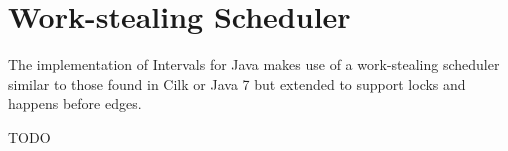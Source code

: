 
\chapter{Work-stealing Scheduler}
\label{chap:work-stealing-scheduler}

The implementation of Intervals for Java makes use of a work-stealing
scheduler similar to those found in Cilk \cite{Blumofe1995} or Java 7
\cite{Lea} but extended to support locks and happens before edges.

TODO

